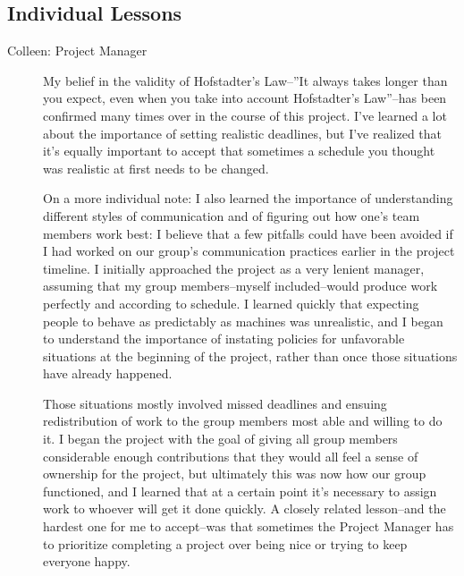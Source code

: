 \subsection{Individual Lessons}
\begin{description}
\item[Colleen: Project Manager] My belief in the validity of
  Hofstadter’s Law--”It always takes longer than you expect, even when
  you take into account Hofstadter's Law”--has been confirmed many
  times over in the course of this project. I’ve learned a lot about
  the importance of setting realistic deadlines, but I’ve realized
  that it’s equally important to accept that sometimes a schedule you
  thought was realistic at first needs to be changed.

  On a more individual note: I also learned the importance of understanding
  different styles of communication and of figuring out how one’s team
  members work best: I believe that a few pitfalls could have
  been avoided if I had worked on our group's communication practices
  earlier in the project timeline. I initially approached the project as
  a very lenient manager, assuming that my group members--myself
  included--would produce work perfectly and according to schedule. I
  learned quickly that expecting people to behave as predictably as
  machines was unrealistic, and I began to understand the importance
  of instating policies for unfavorable situations at the
  beginning of the project, rather than once those situations have
  already happened.

  Those situations mostly involved missed deadlines and ensuing
  redistribution of work to the group members most able and willing
  to do it. I began the project with the goal of giving all
  group members considerable enough contributions that they would
  all feel a sense of ownership for the project, but ultimately this
  was now how our group functioned, and I learned that at a certain
  point it's necessary to assign work to whoever will get it done
  quickly. A closely related lesson--and the hardest one for me to
  accept--was that sometimes the Project Manager has to prioritize
  completing a project over being nice or trying to keep everyone happy.


\end{description}
